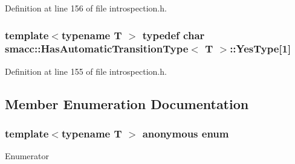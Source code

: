Definition at line 156 of file introspection.\+h.

\subsubsection[{\texorpdfstring{Yes\+Type}{YesType}}]{\setlength{\rightskip}{0pt plus 5cm}template$<$typename T $>$ typedef char {\bf smacc\+::\+Has\+Automatic\+Transition\+Type}$<$ T $>$\+::Yes\+Type\mbox{[}1\mbox{]}\hspace{0.3cm}{\ttfamily [private]}}\hypertarget{classsmacc_1_1HasAutomaticTransitionType_a0261cbc759cb52b6f60495d327a088a4}{}\label{classsmacc_1_1HasAutomaticTransitionType_a0261cbc759cb52b6f60495d327a088a4}


Definition at line 155 of file introspection.\+h.



\subsection{Member Enumeration Documentation}
\subsubsection[{\texorpdfstring{anonymous enum}{anonymous enum}}]{\setlength{\rightskip}{0pt plus 5cm}template$<$typename T $>$ anonymous enum}\hypertarget{classsmacc_1_1HasAutomaticTransitionType_af7c2dd6009f2a3464a9b253b5eabe8e5}{}\label{classsmacc_1_1HasAutomaticTransitionType_af7c2dd6009f2a3464a9b253b5eabe8e5}
\begin{Desc}
\item[Enumerator]\par
\begin{description}
\item[{\em 
value\hypertarget{classsmacc_1_1HasAutomaticTransitionType_af7c2dd6009f2a3464a9b253b5eabe8e5ac3dba7514caf15e85491ccfd880b108b}{}\label{classsmacc_1_1HasAutomaticTransitionType_af7c2dd6009f2a3464a9b253b5eabe8e5ac3dba7514caf15e85491ccfd880b108b}
}]\end{description}
\end{Desc}


